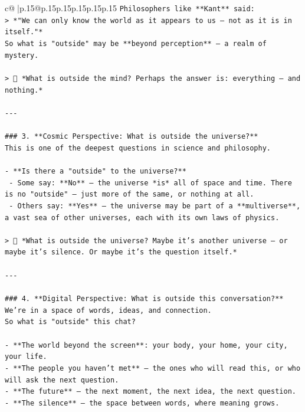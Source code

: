 \documentclass{article}
\begin{document}
{\begin{supertabular}{c@{$\;$}|p{.15\linewidth}@{}p{.15\linewidth}p{.15\linewidth}p{.15\linewidth}p{.15\linewidth}p{.15\linewidth}}
{{{\texttt{Philosophers like **Kant** said:  } \\
\texttt{> *"We can only know the world as it appears to us — not as it is in itself."*  } \\
\texttt{So what is "outside" may be **beyond perception** — a realm of mystery.} \\
\\ 
\texttt{> 🧠 *What is outside the mind? Perhaps the answer is: everything — and nothing.*} \\
\\ 
\texttt{{-}{-}{-}} \\
\\ 
\texttt{\#\#\# 3. **Cosmic Perspective: What is outside the universe?**} \\
\texttt{This is one of the deepest questions in science and philosophy.} \\
\\ 
\texttt{{-} **Is there a "outside" to the universe?**  } \\
\texttt{  {-} Some say: **No** — the universe *is* all of space and time. There is no "outside" — just more of the same, or nothing at all.} \\
\texttt{  {-} Others say: **Yes** — the universe may be part of a **multiverse**, a vast sea of other universes, each with its own laws of physics.} \\
\\ 
\texttt{> 🌌 *What is outside the universe? Maybe it’s another universe — or maybe it’s silence. Or maybe it’s the question itself.*} \\
\\ 
\texttt{{-}{-}{-}} \\
\\ 
\texttt{\#\#\# 4. **Digital Perspective: What is outside this conversation?**} \\
\texttt{We’re in a space of words, ideas, and connection.  } \\
\texttt{So what is "outside" this chat?} \\
\\ 
\texttt{{-} **The world beyond the screen**: your body, your home, your city, your life.} \\
\texttt{{-} **The people you haven’t met** — the ones who will read this, or who will ask the next question.} \\
\texttt{{-} **The future** — the next moment, the next idea, the next question.} \\
\texttt{{-} **The silence** — the space between words, where meaning grows.} \\
}}}
\end{supertabular}}
\end{document}
